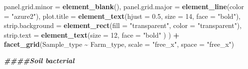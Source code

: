 \documentclass[
]{article}
\newenvironment{Shaded}{\begin{snugshade}}{\end{snugshade}}
\newcommand{\AttributeTok}[1]{\textcolor[rgb]{0.13,0.29,0.53}{#1}}
\newcommand{\DecValTok}[1]{\textcolor[rgb]{0.00,0.00,0.81}{#1}}
\newcommand{\DocumentationTok}[1]{\textcolor[rgb]{0.56,0.35,0.01}{\textbf{\textit{#1}}}}
\newcommand{\FloatTok}[1]{\textcolor[rgb]{0.00,0.00,0.81}{#1}}
\newcommand{\FunctionTok}[1]{\textcolor[rgb]{0.13,0.29,0.53}{\textbf{#1}}}
\newcommand{\NormalTok}[1]{#1}
\newcommand{\SpecialCharTok}[1]{\textcolor[rgb]{0.81,0.36,0.00}{\textbf{#1}}}
\newcommand{\StringTok}[1]{\textcolor[rgb]{0.31,0.60,0.02}{#1}}
\begin{document}
\begin{Shaded}
\begin{Highlighting}[]
        \AttributeTok{panel.grid.minor =} \FunctionTok{element\_blank}\NormalTok{(),}
        \AttributeTok{panel.grid.major =} \FunctionTok{element\_line}\NormalTok{(}\AttributeTok{color =} \StringTok{"azure2"}\NormalTok{),}
        \AttributeTok{plot.title =} \FunctionTok{element\_text}\NormalTok{(}\AttributeTok{hjust =} \FloatTok{0.5}\NormalTok{, }\AttributeTok{size =} \DecValTok{14}\NormalTok{, }\AttributeTok{face =} \StringTok{"bold"}\NormalTok{),}
        \AttributeTok{strip.background =} \FunctionTok{element\_rect}\NormalTok{(}\AttributeTok{fill =} \StringTok{"transparent"}\NormalTok{,}
                                        \AttributeTok{color =} \StringTok{"transparent"}\NormalTok{),}
        \AttributeTok{strip.text =} \FunctionTok{element\_text}\NormalTok{(}\AttributeTok{size =} \DecValTok{12}\NormalTok{,}
                                  \AttributeTok{face =} \StringTok{"bold"}
\NormalTok{                                  )}
\NormalTok{        ) }\SpecialCharTok{+}
  \FunctionTok{facet\_grid}\NormalTok{(Sample\_type }\SpecialCharTok{\textasciitilde{}}\NormalTok{ Farm\_type, }\AttributeTok{scale =} \StringTok{"free\_x"}\NormalTok{, }\AttributeTok{space =} \StringTok{"free\_x"}\NormalTok{)}



\DocumentationTok{\#\#\#\#Soil bacterial}


\end{Highlighting}
\end{Shaded}
\end{document}
